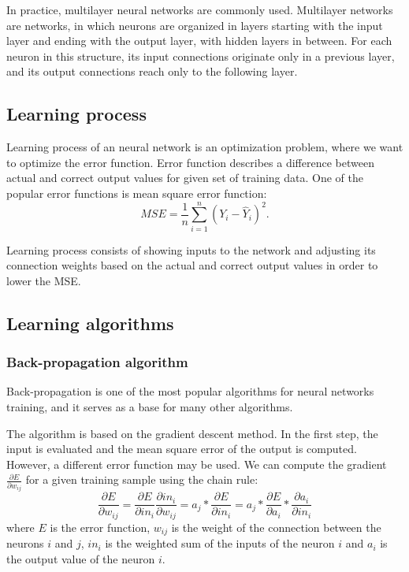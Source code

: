 In practice, multilayer neural networks are commonly used. Multilayer networks are networks, in which neurons are organized in layers starting with the input layer and ending with the output layer, with hidden layers in between. For each neuron in this structure, its input connections originate only in a previous layer, and its output connections reach only to the following layer. 

\subsection{Learning process}
Learning process of an neural network is an optimization problem, where we want to optimize the error function. Error function describes a difference between actual and correct output values for given set of training data. One of the popular error functions is mean square error function:
\begin{equation*}
MSE = \frac{1}{n} \sum_{i=1}^{n} (Y_{i} - \hat{Y}_{i})^2.
\end{equation*}

Learning process consists of showing inputs to the network and adjusting its connection weights based on the actual and correct output values in order to lower the MSE.

\subsection{Learning algorithms}

\subsubsection{Back-propagation algorithm}
Back-propagation is one of the most popular algorithms for neural networks training, and it serves as a base for many other algorithms.

The algorithm is based on the gradient descent method. In the first step, the input is evaluated and the mean square error of the output is computed. However, a different error function may be used. We can compute the gradient $\frac{\partial E}{\partial w_{ij}}$ for a given training sample using the chain rule:
\begin{equation*}
\frac{\partial E}{\partial w_{ij}} = \frac{\partial E}{\partial in_{i}} \frac{\partial in_{i}}{\partial w_{ij}} = 
a_{j}*\frac{\partial E}{\partial in_{i}} = a_{j}*\frac{\partial E}{\partial a_{i}}*\frac{\partial a_{i}}{\partial in_{i}}
\end{equation*}
where $E$ is the error function, $w_{ij}$ is the weight of the connection between the neurons $i$ and $j$, $in_{i}$ is the weighted sum of the inputs of the neuron $i$ and $a_{i}$ is the output value of the neuron $i$.

